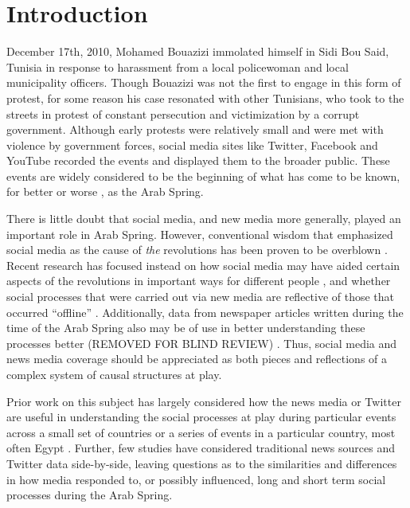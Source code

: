 \section{Introduction}
 December 17th, 2010, Mohamed Bouazizi immolated himself in Sidi Bou Said, Tunisia in response to harassment from a local policewoman and local municipality officers. Though Bouazizi was not the first to engage in this form of protest, for some reason his case resonated with other Tunisians, who took to the streets in protest of constant persecution and victimization by a corrupt government. Although early protests were relatively small and were met with violence by government forces, social media sites like Twitter, Facebook and YouTube recorded the events and displayed them to the broader public. These events are widely considered to be the beginning of what has come to be known, for better or worse \citep{gelvin_arab_2015}, as the Arab Spring.

There is little doubt that social media, and new media \cite{baym_personal_2010} more generally, played an important role in Arab Spring. However, conventional wisdom that emphasized social media as the cause of \emph{the} revolutions has been proven to be overblown \citep{bruns_arab_2013,goldstone_bringing_2013,comunello_will_2012}. Recent research has focused instead on how social media may have aided certain aspects of the revolutions in important ways for different people  \citep{galle_who_2013,starbird_how_2012,lotan_revolutions_2011,tufekci_social_2012}, and whether social processes that were carried out via new media are reflective of those that occurred ``offline'' \citep{comunello_will_2012}. Additionally, data from newspaper articles written during the time of the Arab Spring also may be of use in better understanding these processes better (REMOVED FOR BLIND REVIEW)%
. Thus, social media and news media coverage should be appreciated as both pieces and reflections of a complex system of causal structures at play. 

Prior work on this subject has largely considered how the news media or Twitter are useful in understanding the social processes at play during particular events across a small set of countries \citep[e.g.][]{lotan_revolutions_2011,borge-holthoefer_content_2014} or a series of events in a particular country, most often Egypt \citep[e.g.][]{tufekci_social_2012}.  Further, few studies have considered traditional news sources and Twitter data side-by-side, leaving questions as to the similarities and differences in how media responded to, or possibly influenced, long and short term social processes during the Arab Spring. 

